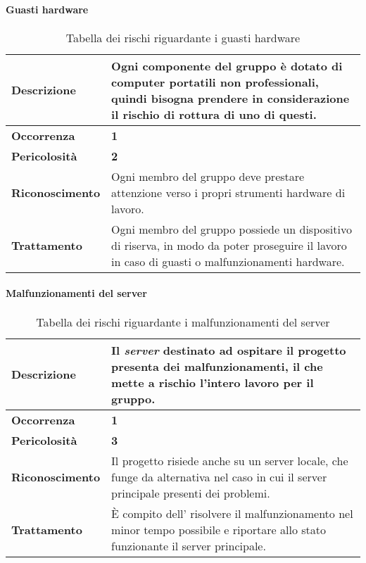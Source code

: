 \paragraph{Guasti hardware}

\begin{table}[H]
	\begin{center}
		\begin{tabular}{|l | p{11cm}|}
			\hline
			\textbf{Descrizione}	& Ogni componente del gruppo è dotato di computer portatili non professionali, quindi bisogna prendere in considerazione il rischio di rottura di uno di questi. \\
			\hline
			\textbf{Occorrenza}	&	\textbf{1}	\\
			\hline
			\textbf{Pericolosità}	&	\textbf{2}	\\
			\hline
			\textbf{Riconoscimento}	&	Ogni membro del gruppo deve prestare attenzione verso i propri strumenti hardware di lavoro.	\\
			\hline
			\textbf{Trattamento}	&	Ogni membro del gruppo possiede un dispositivo di riserva, in modo da poter proseguire il lavoro in caso di guasti o malfunzionamenti hardware.	\\
			\hline
		\end{tabular}
		\caption{Tabella dei rischi riguardante i guasti hardware}
	\end{center}
\end{table}


\paragraph{Malfunzionamenti del server}

\begin{table}[H]
	\begin{center}
		\begin{tabular}{|l | p{11cm}|}
			\hline
			\textbf{Descrizione}	& Il \textit{server\ped{G}} destinato ad ospitare il progetto presenta dei malfunzionamenti, il che mette a rischio l'intero lavoro per il gruppo. \\
			\hline
			\textbf{Occorrenza}	&	\textbf{1}	\\
			\hline
			\textbf{Pericolosità}	&	\textbf{3}	\\
			\hline
			\textbf{Riconoscimento}	&	Il progetto risiede anche su un server locale, che funge da alternativa nel caso in cui il server principale presenti dei problemi.	\\
			\hline
			\textbf{Trattamento}	&	\MakeUppercase{è} compito dell'\textit{\Amm} risolvere il malfunzionamento nel minor tempo possibile e riportare allo stato funzionante il server principale.	\\
			\hline
		\end{tabular}
		\caption{Tabella dei rischi riguardante i malfunzionamenti del server}
	\end{center}
\end{table}


